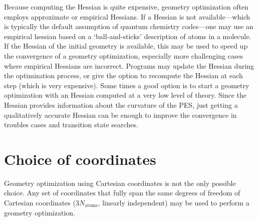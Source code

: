\documentclass[../Main/notes.tex]{subfiles}
\begin{document}
Because computing the Hessian is quite expensive, geometry optimization often employs approximate or empirical Hessians.
If a Hessian is not available---which is typically the default assumption of quantum chemistry codes---one may use an empirical hessian based on a `ball-and-sticks' description of atoms in a molecule.
If the Hessian of the initial geometry is available, this may be used to speed up the convergence of a geometry optimization, especially more challenging cases where empirical Hessians are incorrect.
Programs may update the Hessian during the optimization process, or give the option to recompute the Hessian at each step (which is very expensive).
Some times a good option is to start a geometry optimization with an Hessian computed at a very low level of theory.
Since the Hessian provides information about the curvature of the PES, just getting a qualitatively accurate Hessian can be enough to improve the convergence in troubles cases and transition state searches.

\section{Choice of coordinates}


Geometry optimization using Cartesian coordinates is not the only possible choice.
Any set of coordinates that fully span the same degrees of freedom of Cartesian coordinates (3$N_\mathrm{atoms}$, linearly independent) may be used to perform a geometry optimization.
\end{document}
